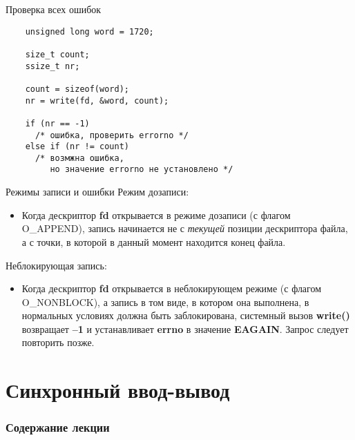 \documentclass[xcolor=table]{beamer}
\begin{document}
\begin{frame}[fragile]{Проверка всех ошибок}
	\begin{verbatim}
	unsigned long word = 1720;
	
	size_t count;
	ssize_t nr;
	
	count = sizeof(word);
	nr = write(fd, &word, count);
	
	if (nr == -1)
	  /* ошибка, проверить errorno */
	else if (nr != count)
	  /* возмжна ошибка, 
	     но значение errorno не установлено */
	\end{verbatim}
\end{frame}

\begin{frame}{Режимы записи и ошибки}
	Режим дозаписи: 
	\begin{itemize}
		\item Когда дескриптор \textbf{fd} открывается в режиме дозаписи (с флагом O\_APPEND), запись начинается не с \textit{текущей} позиции дескриптора файла, а с точки, в которой в данный момент находится конец файла.
	\end{itemize}

	\medskip
	Неблокирующая запись: 
	\begin{itemize}
		\item Когда дескриптор \textbf{fd} открывается в неблокирующем режиме (с флагом O\_NONBLOCK), а запись в том виде, в котором она выполнена, в  нормальных условиях должна быть заблокирована, системный вызов \textbf{write()} возвращает \textbf{–1} и устанавливает \textbf{errno} в значение \textbf{EAGAIN}. Запрос следует повторить позже.
	\end{itemize}	
\end{frame}

\section{Синхронный ввод-вывод}
\begin{frame}
  \frametitle{Содержание лекции}
  \tableofcontents[current]
\end{frame}
\end{document}
